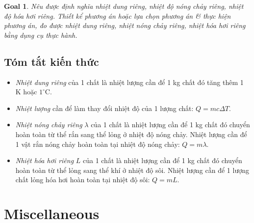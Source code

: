 \documentclass{article}
\newtheorem{goal}{Goal}
\begin{document}
\begin{goal}
	Nêu được định nghĩa nhiệt dung riêng, nhiệt độ nóng chảy riêng, nhiệt độ hóa hơi riêng. Thiết kể phương án hoặc lựa chọn phương án \& thực hiện phương án, đo được nhiệt dung riêng, nhiệt nóng chảy riêng, nhiệt hóa hơi riêng bằng dụng cụ thực hành.
\end{goal}

\subsection{Tóm tắt kiến thức}

\begin{itemize}
	\item {\it Nhiệt dung riêng} của 1 chất là nhiệt lượng cần để 1 kg chất đó tăng thêm 1 K hoặc $1^\circ$C.
	\item {\it Nhiệt lượng} cần để làm thay đổi nhiệt độ của 1 lượng chất: $Q = mc\Delta T$.
	\item {\it Nhiệt nóng chảy riêng} $\lambda$ của 1 chất là nhiệt lượng cần để 1 kg chất đó chuyển hoàn toàn từ thể rắn sang thể lỏng ở nhiệt độ nóng chảy. Nhiệt lượng cần để 1 vật rắn nóng chảy hoàn toàn tại nhiệt độ nóng chảy: $Q = m\lambda$.
	\item {\it Nhiệt hóa hơi riêng} $L$ của 1 chất là nhiệt lượng cần để 1 kg chất đó chuyển hoàn toàn từ thể lỏng sang thể khí ở nhiệt độ sôi. Nhiệt lượng cần để 1 lượng chất lỏng hóa hơi hoàn toàn tại nhiệt độ sôi: $Q = mL$.
\end{itemize}


\section{Miscellaneous}


\printbibliography[heading=bibintoc]
	
\end{document}
